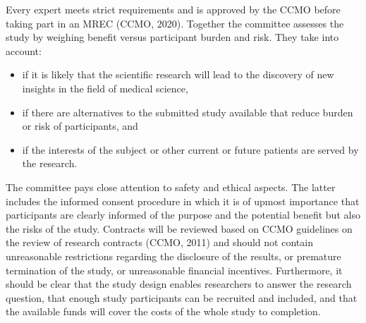 \documentclass[authordate, meta, issue]{jote-new-article}
\begin{document}
Every expert meets strict requirements and is approved by the CCMO before taking part in an MREC (CCMO, 2020). Together the committee assesses the study by weighing benefit versus participant burden and risk. They take into account:


\begin{itemize}


  \item if it is likely that the scientific research will lead to the discovery of new insights in the field of medical science,



  \item
        if there are alternatives to the submitted study available that reduce burden or risk of participants, and



  \item if the interests of the subject or other current or future patients are served by the research.


\end{itemize}

The committee pays close attention to safety and ethical aspects. The latter includes the informed consent procedure in which it is of upmost importance that participants are clearly informed of the purpose and the potential benefit but also the risks of the study. Contracts will be reviewed based on CCMO guidelines on the review of research contracts (CCMO, 2011)  and should not contain unreasonable restrictions regarding the disclosure of the results, or premature termination of the study, or unreasonable financial incentives. Furthermore, it should be clear that the study design enables researchers to answer the research question, that enough study participants can be recruited and included, and that the available funds will cover the costs of the whole study to completion.
\end{document}
